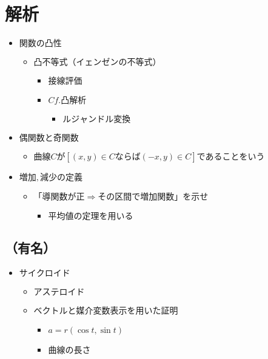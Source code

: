 \documentclass[dvipdfmx,uplatex]{jsarticle}
\begin{document}
\section{解析}
\begin{itemize}
	\item $ 関数の凸性$
	\begin{itemize}
		\item $ 凸不等式（イェンゼンの不等式）$
		\begin{itemize}
			\item $ 接線評価$
			\item $ Cf. 凸解析$
			\begin{itemize}
				\item $ ルジャンドル変換$
			\end{itemize}
		\end{itemize}
	\end{itemize}
	\item $ 偶関数と奇関数$
	\begin{itemize}
		\item $ 曲線Cが [(x,y) \in C ならば (-x,y) \in C] であることをいう$
	\end{itemize}
	\item $ 増加,減少の定義$
	\begin{itemize}
		\item $ 「導関数が正⇒その区間で増加関数」を示せ$
		\begin{itemize}
			\item $ 平均値の定理を用いる$
		\end{itemize}
	\end{itemize}
\end{itemize}
\subsection{（有名）}
\begin{itemize}
	\item $ サイクロイド$
	\begin{itemize}
		\item $ アステロイド$
		\item $ ベクトルと媒介変数表示を用いた証明$
		\begin{itemize}
			\item $ a = r(\cos t, \sin t)$
			\item $ 曲線の長さ$
		\end{itemize}
	\end{itemize}
\end{itemize}
\end{document}
